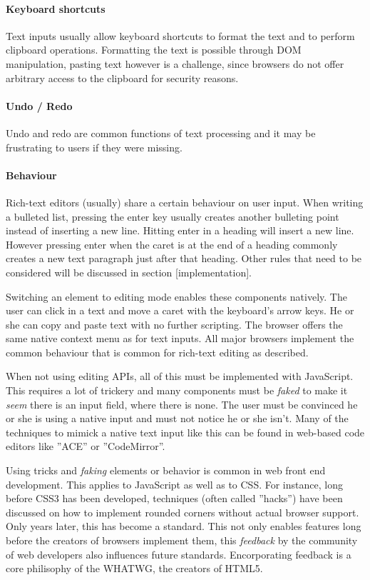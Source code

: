 \paragraph{Keyboard shortcuts} Text inputs usually allow keyboard shortcuts to format the text and to perform clipboard operations. Formatting the text is possible through DOM manipulation, pasting text however is a challenge, since browsers do not offer arbitrary access to the clipboard for security reasons.

\paragraph{Undo / Redo} Undo and redo are common functions of text processing and it may be frustrating to users if they were missing.

\paragraph{Behaviour} Rich-text editors (usually) share a certain behaviour on user input. When writing a bulleted list, pressing the enter key usually creates another bulleting point instead of inserting a new line. Hitting enter in  a heading will insert a new line. However pressing enter when the caret is at the end of a heading commonly creates a new text paragraph just after that heading. Other rules that need to be considered will be discussed in section [implementation].

Switching an element to editing mode enables these components natively. The user can click in a text and move a caret with the keyboard's arrow keys. He or she can copy and paste text with no further scripting. The browser offers the same native context menu as for text inputs. All major browsers implement the common behaviour that is common for rich-text editing as described.

When not using editing APIs, all of this must be implemented with JavaScript. This requires a lot of trickery and many components must be \textit{faked} to make it \textit{seem} there is an input field, where there is none. The user must be convinced he or she is using a native input and must not notice he or she isn't. Many of the techniques to mimick a native text input like this can be found in web-based code editors like ''ACE'' or ''CodeMirror''.

Using tricks and \textit{faking} elements or behavior is common in web front end development. This applies to JavaScript as well as to CSS. For instance, long before CSS3 has been developed, techniques (often called ''hacks'') have been discussed on how to implement rounded corners without actual browser support. Only years later, this has become a standard. This not only enables features long before the creators of browsers implement them, this \textit{feedback} by the community of web developers also influences future standards. Encorporating feedback is a core philisophy of the WHATWG, the creators of HTML5.

